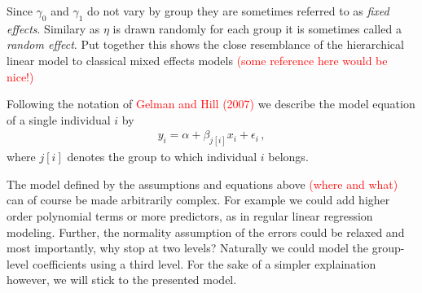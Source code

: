 Since $\gamma_0$ and $\gamma_1$ do not vary by group they are sometimes referred
to as \emph{fixed effects}. Similary as $\eta$ is drawn randomly for each group
it is sometimes called a \emph{random effect}. Put together this shows the close
resemblance of the hierarchical linear model to classical mixed effects models
\textcolor{red}{(some reference here would be nice!)}

Following the notation of \textcolor{red}{Gelman and Hill (2007)} we describe the
model equation of a single individual $i$ by
\begin{align}
  y_i = \alpha + \beta_{j[i]} x_i + \epsilon_i \,,
\end{align}
where $j[i]$ denotes the group to which individual $i$ belongs.

The model defined by the assumptions and equations above \textcolor{red}{(where and what)} can of course be made
arbitrarily complex. For example we could add higher order polynomial terms or
more predictors, as in regular linear regression modeling. Further, the
normality assumption of the errors could be relaxed and most importantly, why
stop at two levels? Naturally we could model the group-level coefficients using
a third level. For the sake of a simpler explaination however, we will stick to
the presented model.

